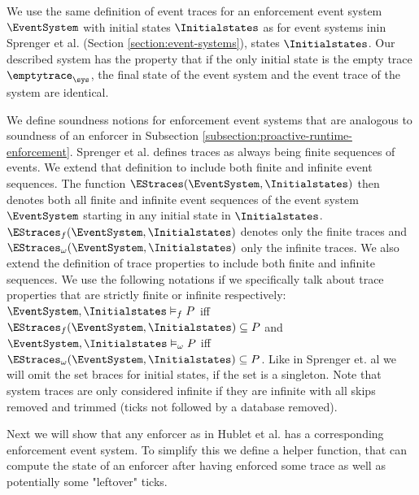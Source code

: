 We use the same definition of event traces for an enforcement event system 
$\EventSystem$ with initial states $\Initialstates$ as for
event systems inin Sprenger et al. \cite{igloo} (Section \ref{section:event-systems}),
states $\Initialstates$.
Our described system has the property that if the only initial state is
the empty trace $\emptytrace_\sys$, the final state of the event system
and the event trace of the system are identical.

We define soundness notions for enforcement event systems that are analogous to
soundness of an enforcer in Subsection
\ref{subsection:proactive-runtime-enforcement}.
Sprenger et al. \cite{igloo} defines traces as always being finite sequences of
events. We extend that definition to include both finite and infinite
event sequences.
The function $\EStraces(\EventSystem, \Initialstates)$ then denotes both all
finite and infinite event sequences of the event system $\EventSystem$
starting in any initial state in $\Initialstates$.
$\EStraces_f(\EventSystem, \Initialstates)$ denotes only the finite traces
and $\EStraces_\omega(\EventSystem, \Initialstates)$ only the
infinite traces.
We also extend the definition of trace properties to include both
finite and infinite sequences.
We use the following notations if we specifically talk
about trace properties that are strictly finite or infinite respectively:
$\EventSystem, \Initialstates \vDash_f P$ iff
$\EStraces_f(\EventSystem, \Initialstates) \subseteq P$
and
$\EventSystem, \Initialstates \vDash_\omega P$ iff
$\EStraces_\omega(\EventSystem, \Initialstates) \subseteq P$.
Like in Sprenger et. al \cite{igloo} we will omit the set braces
for initial states, if the set is a singleton.
Note that system traces are only considered infinite if they
are infinite with all skips removed and trimmed (ticks not followed
by a database removed).

Next we will show that any enforcer as in Hublet et al. \cite{whyenf} has a
corresponding enforcement event system.
To simplify this we define a helper function, that can compute the
state of an enforcer after having enforced some trace as well as potentially
some "leftover" ticks.

